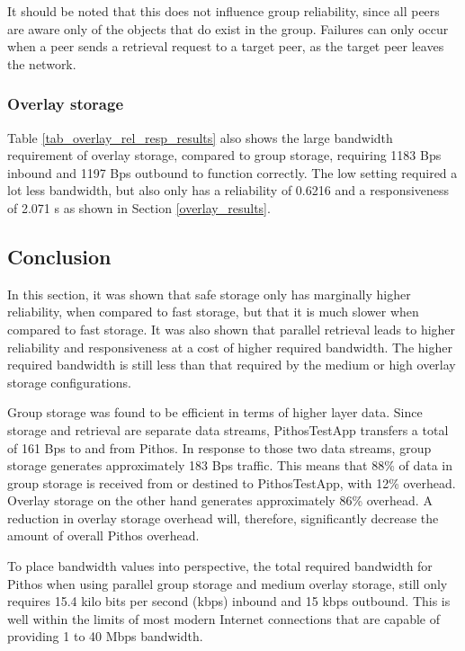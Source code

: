 It should be noted that this does not influence group reliability, since all peers are aware only of the objects that do exist in the group. Failures can only occur when a peer sends a retrieval request to a target peer, as the target peer leaves the network.

\subsubsection{Overlay storage}
Table \ref{tab_overlay_rel_resp_results} also shows the large bandwidth requirement of overlay storage, compared to group storage, requiring 1183 Bps inbound and 1197 Bps outbound to function correctly. The low setting required a lot less bandwidth, but also only has a reliability of 0.6216 and a responsiveness of 2.071 s as shown in Section \ref{overlay_results}.

\subsection{Conclusion}

In this section, it was shown that safe storage only has marginally higher reliability, when compared to fast storage, but that it is much slower when compared to fast storage. It was also shown that parallel retrieval leads to higher reliability and responsiveness at a cost of higher required bandwidth. The higher required bandwidth is still less than that required by the medium or high overlay storage configurations.

Group storage was found to be efficient in terms of higher layer data. Since storage and retrieval are separate data streams, PithosTestApp transfers a total of 161 Bps to and from Pithos. In response to those two data streams, group storage generates approximately 183 Bps traffic. This means that 88\% of data in group storage is received from or destined to PithosTestApp, with 12\% overhead. Overlay storage on the other hand generates approximately 86\% overhead. A reduction in overlay storage overhead will, therefore, significantly decrease the amount of overall Pithos overhead.

To place bandwidth values into perspective, the total required bandwidth for Pithos when using parallel group storage and medium overlay storage, still only requires 15.4 kilo bits per second (kbps) inbound and 15 kbps outbound. This is well within the limits of most modern Internet connections that are capable of providing 1 to 40 Mbps bandwidth.

